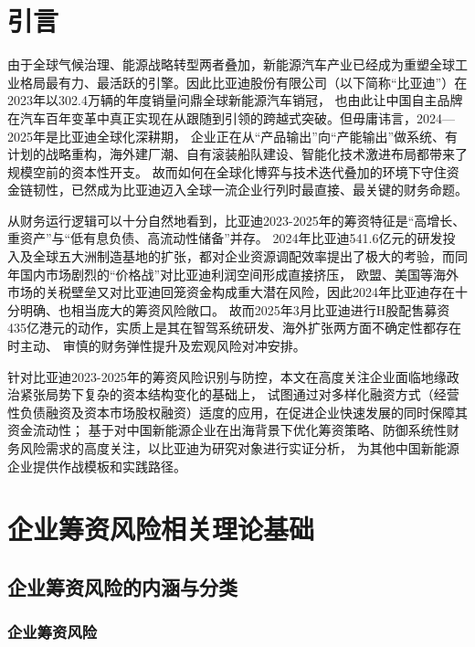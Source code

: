 \documentclass[12pt,a4paper,fontset=windows,UTF8]{ctexart}
\begin{document}

\newpage

\section*{引言}
{}

由于全球气候治理、能源战略转型两者叠加，新能源汽车产业已经成为重塑全球工业格局最有力、最活跃的引擎。因此比亚迪股份有限公司（以下简称“比亚迪”）在2023年以302.4万辆的年度销量问鼎全球新能源汽车销冠，
  也由此让中国自主品牌在汽车百年变革中真正实现在从跟随到引领的跨越式突破。但毋庸讳言，2024—2025年是比亚迪全球化深耕期，
  企业正在从“产品输出”向“产能输出”做系统、有计划的战略重构，海外建厂潮、自有滚装船队建设、智能化技术激进布局都带来了规模空前的资本性开支。
  故而如何在全球化博弈与技术迭代叠加的环境下守住资金链韧性，已然成为比亚迪迈入全球一流企业行列时最直接、最关键的财务命题。

从财务运行逻辑可以十分自然地看到，比亚迪2023-2025年的筹资特征是“高增长、重资产”与“低有息负债、高流动性储备”并存。
  2024年比亚迪541.6亿元的研发投入及全球五大洲制造基地的扩张，都对企业资源调配效率提出了极大的考验，而同年国内市场剧烈的“价格战”对比亚迪利润空间形成直接挤压，
  欧盟、美国等海外市场的关税壁垒又对比亚迪回笼资金构成重大潜在风险，因此2024年比亚迪存在十分明确、也相当庞大的筹资风险敞口。
  故而2025年3月比亚迪进行H股配售募资435亿港元的动作，实质上是其在智驾系统研发、海外扩张两方面不确定性都存在时主动、
  审慎的财务弹性提升及宏观风险对冲安排。

针对比亚迪2023-2025年的筹资风险识别与防控，本文在高度关注企业面临地缘政治紧张局势下复杂的资本结构变化的基础上，
  试图通过对多样化融资方式（经营性负债融资及资本市场股权融资）适度的应用，在促进企业快速发展的同时保障其资金流动性；
  基于对中国新能源企业在出海背景下优化筹资策略、防御系统性财务风险需求的高度关注，以比亚迪为研究对象进行实证分析，
  为其他中国新能源企业提供作战模板和实践路径。

\section{企业筹资风险相关理论基础}

\subsection{企业筹资风险的内涵与分类}

\subsubsection{企业筹资风险}
\end{document}
